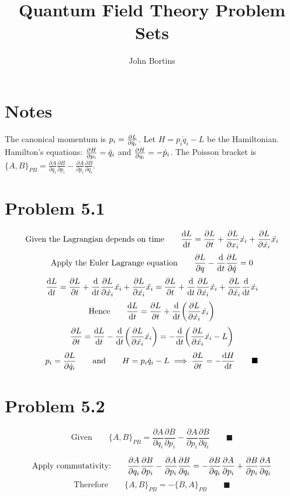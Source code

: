 \documentclass{article}
\title{Quantum Field Theory Problem Sets}
\author{John Bortins}
\begin{document}
 
\maketitle{}

\section*{Notes}
The canonical momentum is $p_i=\pdv{L}{\dot{q}_i}$. Let $H=p_i\dot{q}_i-L$ be the Hamiltonian. Hamilton's equations: $\pdv{H}{p_i}=\dot{q}_i$ and $\pdv{H}{q_i}=-\dot{p}_i$. The Poisson bracket is $\{A,B\}_{PB} = \frac{\partial A}{\partial q_{i}} \frac{\partial B}{\partial p_{i}} - \frac{\partial A}{\partial p_{i}} \frac{\partial B}{\partial q_{i}}$.
 
\section*{Problem 5.1}



\[ \text{Given the Lagrangian depends on time}\qquad \dv{L}{t}=\pdv{L}{t}+\pdv{L}{x_{i}}\dot{x_{i}}+\pdv{L}{\dot{x_{i}}}\ddot{x_{i}} \]
\[ \text{Apply the Euler Lagrange equation}\qquad \pdv{L}{q}-\dv{t} \pdv{L}{\dot{q}}=0 \]
\[ \dv{L}{t}=\pdv{L}{t}+\dv{t} \pdv{L}{\dot{x_{i}}}\dot{x_{i}}+\pdv{L}{\dot{x_{i}}}\ddot{x_{i}}=\pdv{L}{t}+\dv{t} \pdv{L}{\dot{x_{i}}}\dot{x_{i}}+\pdv{L}{\dot{x_{i}}}\dv{t}\dot{x_{i}} \] 
\[ \text{Hence}\qquad \dv{L}{t}=\pdv{L}{t}+\dv{t} \qty(\pdv{L}{\dot{x_{i}}}\dot{x_{i}}) \]
\[  \pdv{L}{t}=\dv{L}{t}-\dv{t} \qty(\pdv{L}{\dot{x_{i}}}\dot{x_{i}})=-\dv{t} \qty(\pdv{L}{\dot{x_{i}}}\dot{x_{i}}-L) \]
\[ p_{i}=\pdv{L}{\dot{q}_{i}}\qquad\text{and}\qquad H=p_{i}\dot{q}_{i}-L \implies \pdv{L}{t}=-\dv{H}{t} \qquad\blacksquare \]

\section*{Problem 5.2}
 

\[ \text{Given}\qquad\{A,B\}_{PB} = \frac{\partial A}{\partial q_{i}} \frac{\partial B}{\partial p_{i}} - \frac{\partial A}{\partial p_{i}} \frac{\partial B}{\partial q_{i}} \qquad\blacksquare \]  

\[\text{Apply commutativity:}\qquad \frac{\partial A}{\partial q_{i}} \frac{\partial B}{\partial p_{i}} - \frac{\partial A}{\partial p_{i}} \frac{\partial B}{\partial q_{i}}=-\pdv{B}{q_{i}}\pdv{A}{p_{i}}+\pdv{B}{p_{i}}\pdv{A}{q_{i}}\]
\[ \text{Therefore}\qquad\{A,B\}_{PB} = -\{B,A\}_{PB} \qquad\blacksquare \]
\end{document}
